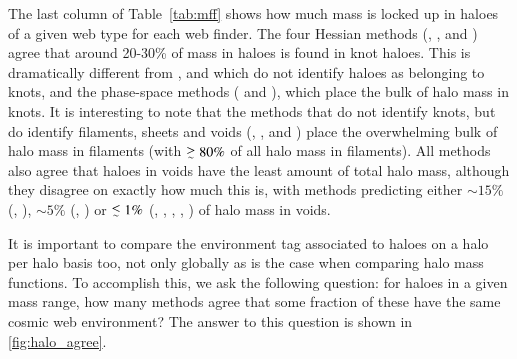 %
%

The last column of Table~\ref{tab:mff} shows how much mass is locked up in haloes of a given web type for each web finder. The four Hessian methods (\nexus{}, \tweb{}, \vweb{} and \classic{}) agree that around 20-30\% of mass in haloes is found in knot haloes. This is dramatically different from \disperse{}, \mmft{} and \spine{} which do not identify haloes as belonging to knots, and the phase-space methods (\origami{} and \mswa{}), which place the bulk of halo mass in knots. It is interesting to note that the methods that do not identify knots, but do identify filaments, sheets and voids (\spine{}, \mmft{}, and \disperse{}) place the overwhelming bulk of halo mass in filaments (with $\gsim 80\%$ of all halo mass in filaments). All methods also agree that haloes in voids have the least amount of total halo mass, although they disagree on exactly how much this is, with methods predicting either $\sim 15\%$  (\vweb{}, \classic{}), $\sim 5\%$ (\tweb{}, \disperse{}) or $\lsim 1\%$ (\nexus{}, \origami{}, \mswa{}, \spine, \mmft) of halo mass in voids.


It is important to compare the environment tag associated to haloes on a halo per halo basis too, not only globally as is the case when comparing halo mass functions. To accomplish this, we ask the following question: for haloes in a given mass range, how many methods agree that some fraction of these have the same cosmic web environment? The answer to this question is shown in \autoref{fig:halo_agree}.

